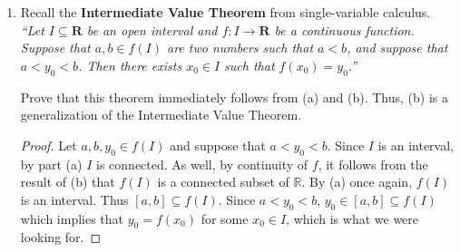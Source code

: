 \documentclass{article}
\newcommand{\R}{\mathbf{R}}
\theoremstyle{plain} %
\numberwithin{thm}{section} %
\theoremstyle{definition}
\begin{document}
\begin{enumerate}[label=(\alph*)]
\begin{proof}
                To show that \(f^{-1} (A)\) is open, we use the topological definition of continuity of \(f\) to conclude that since \(A\) is open, \(f^{-1} (A)\) is open as well.
    
                We can apply the same argument for \(f^{-1} (B)\), so \(B\) is non-empty and open as well.
    
                Thus \(f^{-1} (A), f^{-1} (B)\) are non-empty, disjoint, and open. It remains to show that \(f^{-1} (A) \cup f^{-1} (B) = C\). Immediately, we know that \(f^{-1} (A) \subseteq C\) and \(f^{-1} (B) \subseteq C\), so \(f^{-1} (A) \cup f^{-1} (B) \subseteq C\).
    
                For the other direction, let \(x \in C\). We know that \(f(x) \in f(C)\), which means that either \(f(x) \in A\) or \(f(x) \in B\). It follows that \(x \in f^{-1} (A)\) or \(x \in f^{-1} (B) \implies x \in f^{-1} (A) \cup f^{-1} (B)\). Thus \(f^{-1} (A) \cup f^{-1} (B) = C\).
    
                We conclude that \(C\) is a disconnected subset of \(X\), which shows that the contrapositive of the original statement is true, completing the proof.
                
            \end{proof}
            
            \item Recall the \textbf{Intermediate Value Theorem} from single-variable calculus. \textit{``Let $I\subseteq \R$ be an open interval and $f:I\rightarrow \R$ be a continuous function. Suppose that $a,b\in f(I)$ are two numbers such that $a<b$, and suppose that $a<y_0<b$. Then there exists $x_0\in I$ such that $f(x_0)=y_0$.''}
    
            Prove that this theorem immediately follows from (a) and (b). Thus, (b) is a generalization of the Intermediate Value Theorem.
    
            \begin{proof}
                Let \(a,b,y_0 \in f(I)\) and suppose that \(a<y_0<b\). Since \(I\) is an interval, by part (a) \(I\) is connected. As well, by continuity of \(f\), it follows from the result of (b) that \(f(I)\) is a connected subset of \(\mathbb{R}\). By (a) once again, \(f(I)\) is an interval. Thus \([a,b] \subseteq f(I)\). Since \(a<y_0<b\), \(y_0 \in [a,b] \subseteq f(I)\) which implies that \(y_0 = f(x_0)\) for some \(x_0 \in I\), which is what we were looking for.
            \end{proof}
        \end{enumerate}
\end{document}
